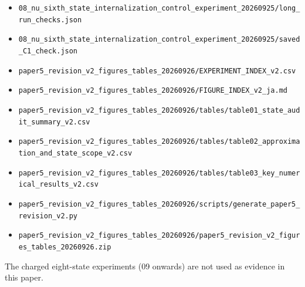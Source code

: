 \documentclass[
  a4paper,
]{article}
\begin{document}
\begin{itemize}
\item
  \texttt{08\_\allowbreak{}nu\_\allowbreak{}sixth\_\allowbreak{}state\_\allowbreak{}internalization\_\allowbreak{}control\_\allowbreak{}experiment\_\allowbreak{}20260925/\allowbreak{}long\_\allowbreak{}run\_\allowbreak{}checks.json}
\item
  \texttt{08\_\allowbreak{}nu\_\allowbreak{}sixth\_\allowbreak{}state\_\allowbreak{}internalization\_\allowbreak{}control\_\allowbreak{}experiment\_\allowbreak{}20260925/\allowbreak{}saved\_\allowbreak{}C1\_\allowbreak{}check.json}
\item
  \texttt{paper5\_\allowbreak{}revision\_\allowbreak{}v2\_\allowbreak{}figures\_\allowbreak{}tables\_\allowbreak{}20260926/\allowbreak{}EXPERIMENT\_\allowbreak{}INDEX\_\allowbreak{}v2.csv}
\item
  \texttt{paper5\_\allowbreak{}revision\_\allowbreak{}v2\_\allowbreak{}figures\_\allowbreak{}tables\_\allowbreak{}20260926/\allowbreak{}FIGURE\_\allowbreak{}INDEX\_\allowbreak{}v2\_\allowbreak{}ja.md}
\item
  \texttt{paper5\_\allowbreak{}revision\_\allowbreak{}v2\_\allowbreak{}figures\_\allowbreak{}tables\_\allowbreak{}20260926/\allowbreak{}tables/\allowbreak{}table01\_\allowbreak{}state\_\allowbreak{}audit\_\allowbreak{}summary\_\allowbreak{}v2.csv}
\item
  \texttt{paper5\_\allowbreak{}revision\_\allowbreak{}v2\_\allowbreak{}figures\_\allowbreak{}tables\_\allowbreak{}20260926/\allowbreak{}tables/\allowbreak{}table02\_\allowbreak{}approximation\_\allowbreak{}and\_\allowbreak{}state\_\allowbreak{}scope\_\allowbreak{}v2.csv}
\item
  \texttt{paper5\_\allowbreak{}revision\_\allowbreak{}v2\_\allowbreak{}figures\_\allowbreak{}tables\_\allowbreak{}20260926/\allowbreak{}tables/\allowbreak{}table03\_\allowbreak{}key\_\allowbreak{}numerical\_\allowbreak{}results\_\allowbreak{}v2.csv}
\item
  \texttt{paper5\_\allowbreak{}revision\_\allowbreak{}v2\_\allowbreak{}figures\_\allowbreak{}tables\_\allowbreak{}20260926/\allowbreak{}scripts/\allowbreak{}generate\_\allowbreak{}paper5\_\allowbreak{}revision\_\allowbreak{}v2.py}
\item
  \texttt{paper5\_\allowbreak{}revision\_\allowbreak{}v2\_\allowbreak{}figures\_\allowbreak{}tables\_\allowbreak{}20260926/\allowbreak{}paper5\_\allowbreak{}revision\_\allowbreak{}v2\_\allowbreak{}figures\_\allowbreak{}tables\_\allowbreak{}20260926.zip}
\end{itemize}

The charged eight-state experiments (09 onwards) are not used as
evidence in this paper.
\end{document}
